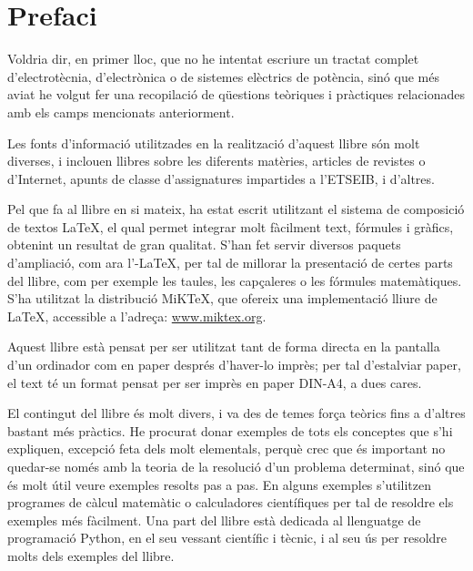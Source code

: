 \chapter*{Prefaci} 

   Voldria dir, en primer lloc, que no he intentat escriure un tractat complet
   d'electrotècnia, d'electrònica o de sistemes elèctrics de potència, sinó que més aviat
   he volgut
   fer una recopilació de qüestions teòriques i pràctiques relacionades amb els camps mencionats
   anteriorment.

   Les fonts d'informació utilitzades en la realització d'aquest llibre són molt diverses,
   i inclouen llibres sobre les diferents matèries, articles de revistes o d'Internet,
   apunts de classe d'assignatures impartides a l'ETSEIB, i d'altres.

   Pel que fa al llibre en si mateix, ha estat escrit utilitzant el sistema de composició de
   textos \LaTeX, el qual
   permet integrar molt fàcilment text, fórmules i gràfics, obtenint un resultat de
   gran qualitat. S'han fet servir diversos paquets d'ampliació, com ara
   l'\AmS-\LaTeX,
   per tal de millorar la presentació de certes parts del
   llibre, com per exemple les taules, les capçaleres o les fórmules matemàtiques. S'ha utilitzat la distribució MiK\TeX, que ofereix una implementació lliure de \LaTeX , accessible a l'adreça: \href{http://www.miktex.org/}{www.miktex.org}.

   Aquest llibre està pensat per  ser utilitzat tant de forma directa en la pantalla d'un
   ordinador com en paper després d'haver-lo imprès; per tal d'estalviar paper, el text
   té un format pensat per  ser imprès en paper DIN-A4, a dues cares.

    El contingut del llibre és molt divers, i va des de temes força teòrics fins a
    d'altres bastant més pràctics. He procurat donar exemples de tots els conceptes
    que s'hi expliquen, excepció feta dels molt elementals, perquè crec que és important
     no quedar-se només amb la teoria de  la resolució d'un problema determinat, sinó que
     és molt útil veure exemples resolts pas a pas. En alguns exemples s'utilitzen programes de càlcul matemàtic o calculadores científiques per tal de resoldre els exemples més fàcilment. Una part  del llibre està dedicada al llenguatge de programació Python, en el seu vessant científic i tècnic, i al seu ús  per resoldre molts dels exemples del llibre.
     
